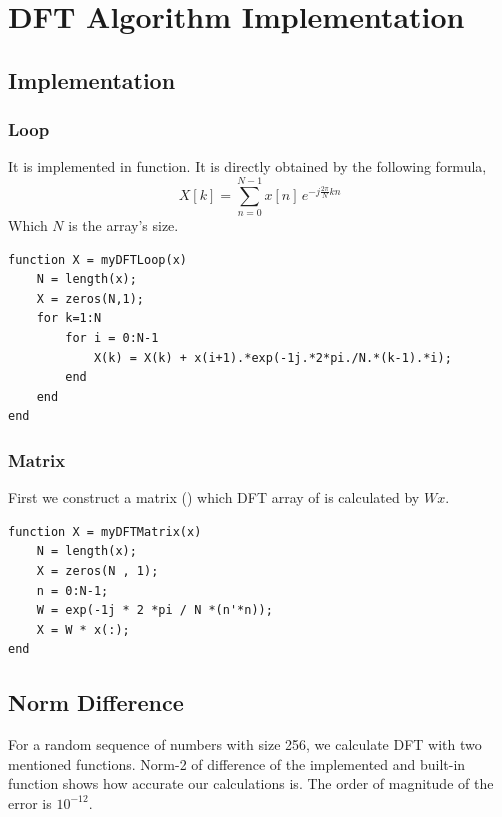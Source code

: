 \documentclass[12pt]{article}
\begin{document}
	
	\newpage
	\pagestyle{fancy}
	\fancyhf{}
	\cfoot{\thepage}
	
	\section{DFT Algorithm Implementation}
	\subsection{Implementation}
	\subsubsection{Loop}
	It is implemented in  function. It is directly obtained by the following formula,
	\begin{equation}
		X[k] = \sum_{n =0}^{N-1} x[n] \, e^{-j \frac{2\pi}{N} k n}
	\end{equation}
	Which $N$ is the array's size.
	
	\begin{lstlisting}
function X = myDFTLoop(x)
	N = length(x);
	X = zeros(N,1);
	for k=1:N
		for i = 0:N-1
			X(k) = X(k) + x(i+1).*exp(-1j.*2*pi./N.*(k-1).*i);
		end
	end
end
	\end{lstlisting}
		
\subsubsection{Matrix}
First we construct a matrix () which DFT array of  is calculated by $W x$. 
\begin{lstlisting}
function X = myDFTMatrix(x)
	N = length(x);
	X = zeros(N , 1);
	n = 0:N-1;
	W = exp(-1j * 2 *pi / N *(n'*n));
	X = W * x(:);
end
\end{lstlisting}
\subsection{Norm Difference}
For a random sequence of numbers with size 256, we calculate DFT with two mentioned functions. Norm-2 of difference of the implemented and built-in function shows how accurate our calculations is.
The order of magnitude of the error is $10^{-12}$. 
\end{document}
